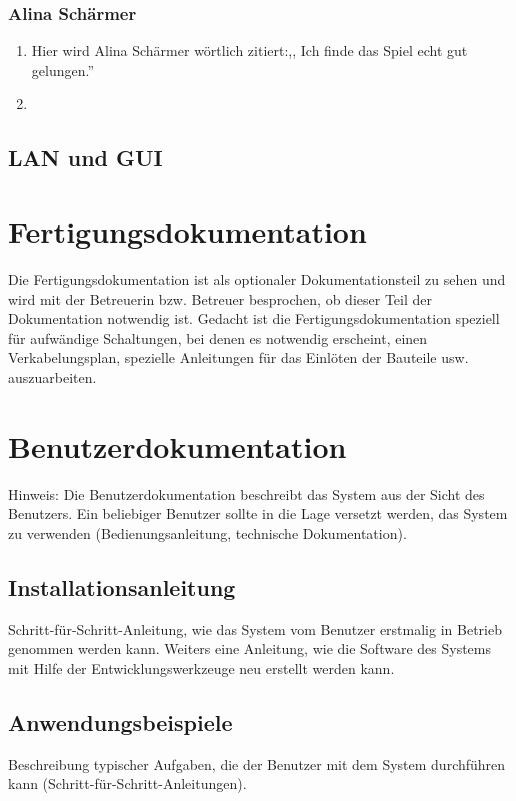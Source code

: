 \documentclass[12pt,a4paper]{article}
\newcommand{\yhbu}[0]{\color{ydkbu}}	%
\begin{document}
{\subsubsection*{Alina Schärmer}
\begin{enumerate}[I]
	\item{Hier wird Alina Schärmer wörtlich zitiert:,, Ich finde das Spiel echt gut gelungen.''}
	\item{}
\end{enumerate}

\subsection{LAN und GUI}
\label{SUBSEC:BETALAN}


\clearpage\vfill\newpage{}
\section{\sc Fertigungsdokumentation}
	{\yhbu
	Die Fertigungsdokumentation ist als optionaler Dokumentationsteil zu sehen und
	wird mit der Betreuerin bzw. Betreuer besprochen, ob dieser Teil der Dokumentation
	notwendig ist. Gedacht ist die Fertigungsdokumentation speziell für aufwändige
	Schaltungen, bei denen es notwendig erscheint, einen Verkabelungsplan, spezielle
	Anleitungen für das Einlöten der Bauteile usw. auszuarbeiten.
	}
\section{\sc Benutzerdokumentation}
	{\yhbu
	Hinweis: Die Benutzerdokumentation beschreibt das System aus der Sicht des
	Benutzers. Ein beliebiger Benutzer sollte in die Lage versetzt werden, das System
	zu verwenden (Bedienungsanleitung, technische Dokumentation).
	}
 \subsection{Installationsanleitung}
	{\yhbu
	Schritt-für-Schritt-Anleitung, wie das System vom Benutzer erstmalig in Betrieb
	genommen werden kann. Weiters eine Anleitung, wie die Software des Systems mit
	Hilfe der Entwicklungswerkzeuge neu erstellt werden kann.
	}
 \subsection{Anwendungsbeispiele}
	{\yhbu
	Beschreibung typischer Aufgaben, die der Benutzer mit dem System durchführen
	kann (Schritt-für-Schritt-Anleitungen).
	}
}
\end{document}
